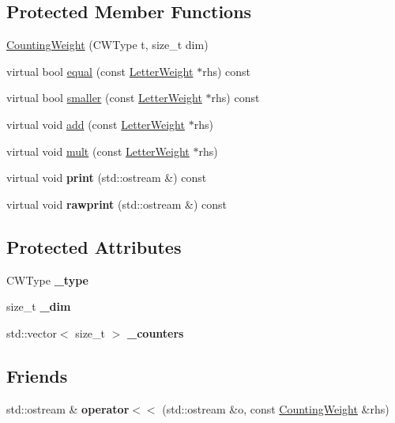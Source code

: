 \subsection*{Protected Member Functions}
\begin{DoxyCompactItemize}
\item 
\mbox{\hyperlink{group__weight_gaff2b14e164c777c04be1a0e3c73b71fa}{Counting\+Weight}} (C\+W\+Type t, size\+\_\+t dim)
\item 
virtual bool \mbox{\hyperlink{group__weight_ga33f06a811859bdbbf1c0ad2e34299df9}{equal}} (const \mbox{\hyperlink{classLetterWeight}{Letter\+Weight}} $\ast$rhs) const
\item 
virtual bool \mbox{\hyperlink{group__weight_ga149e9ae84c83b9235d512c68fec54d1c}{smaller}} (const \mbox{\hyperlink{classLetterWeight}{Letter\+Weight}} $\ast$rhs) const
\item 
virtual void \mbox{\hyperlink{group__weight_ga01ca779f7d5378564f4419150d7ae1f5}{add}} (const \mbox{\hyperlink{classLetterWeight}{Letter\+Weight}} $\ast$rhs)
\item 
virtual void \mbox{\hyperlink{group__weight_ga102af16b814daad826afb91d6f6c75b3}{mult}} (const \mbox{\hyperlink{classLetterWeight}{Letter\+Weight}} $\ast$rhs)
\item 
virtual void {\bfseries print} (std\+::ostream \&) const
\item 
virtual void {\bfseries rawprint} (std\+::ostream \&) const
\end{DoxyCompactItemize}
\subsection*{Protected Attributes}
\begin{DoxyCompactItemize}
\item 
\mbox{\label{classCountingWeight_a3b1e3ac9e87f34af7d041b8eac01bfb1}} 
C\+W\+Type {\bfseries \+\_\+type}
\item 
\mbox{\label{classCountingWeight_ab1f3033b8d14a5389572f158a2b8b757}} 
size\+\_\+t {\bfseries \+\_\+dim}
\item 
\mbox{\label{classCountingWeight_a951d677729f631cd63505f10fac4cd31}} 
std\+::vector$<$ size\+\_\+t $>$ {\bfseries \+\_\+counters}
\end{DoxyCompactItemize}
\subsection*{Friends}
\begin{DoxyCompactItemize}
\item 
\mbox{\label{classCountingWeight_ab340452fea725573e28644234d68147e}} 
std\+::ostream \& {\bfseries operator$<$$<$} (std\+::ostream \&o, const \mbox{\hyperlink{classCountingWeight}{Counting\+Weight}} \&rhs)
\end{DoxyCompactItemize}


